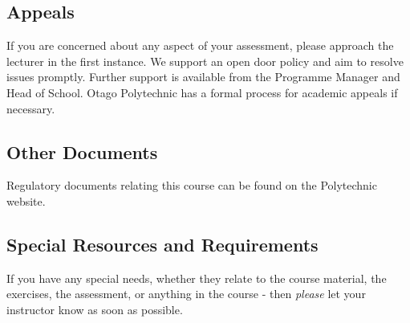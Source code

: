 \documentclass{article}
\begin{document}
\subsection*{Appeals}
If you are concerned about any aspect of your assessment, please approach the lecturer in the first instance.  We support
an open door policy and aim to resolve issues promptly.  Further support is available from the Programme
Manager and Head of School. Otago Polytechnic has a formal process for academic appeals if necessary.

\subsection*{Other Documents}
Regulatory documents relating this course can be found on the Polytechnic website.




\subsection*{Special Resources and Requirements}
If you have any special needs, whether they relate to the course material, the exercises, the assessment, or anything in the course -
then \textit{please} let your instructor know as soon as possible.
\end{document}
